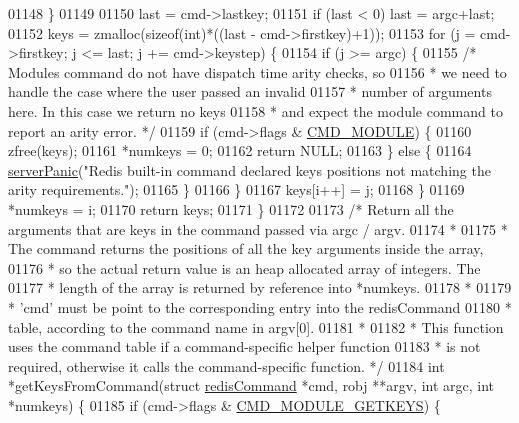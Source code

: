 \begin{DoxyCode}
01148     \}
01149 
01150     last = cmd->lastkey;
01151     \textcolor{keywordflow}{if} (last < 0) last = argc+last;
01152     keys = zmalloc(\textcolor{keyword}{sizeof}(\textcolor{keywordtype}{int})*((last - cmd->firstkey)+1));
01153     \textcolor{keywordflow}{for} (j = cmd->firstkey; j <= last; j += cmd->keystep) \{
01154         \textcolor{keywordflow}{if} (j >= argc) \{
01155             \textcolor{comment}{/* Modules command do not have dispatch time arity checks, so}
01156 \textcolor{comment}{             * we need to handle the case where the user passed an invalid}
01157 \textcolor{comment}{             * number of arguments here. In this case we return no keys}
01158 \textcolor{comment}{             * and expect the module command to report an arity error. */}
01159             \textcolor{keywordflow}{if} (cmd->flags & \hyperlink{server_8h_accabd32f20281543986166c219124f9e}{CMD\_MODULE}) \{
01160                 zfree(keys);
01161                 *numkeys = 0;
01162                 \textcolor{keywordflow}{return} NULL;
01163             \} \textcolor{keywordflow}{else} \{
01164                 \hyperlink{server_8h_a11cc378e7778a830b41240578de3b204}{serverPanic}(\textcolor{stringliteral}{"Redis built-in command declared keys positions not matching
       the arity requirements."});
01165             \}
01166         \}
01167         keys[i++] = j;
01168     \}
01169     *numkeys = i;
01170     \textcolor{keywordflow}{return} keys;
01171 \}
01172 
01173 \textcolor{comment}{/* Return all the arguments that are keys in the command passed via argc / argv.}
01174 \textcolor{comment}{ *}
01175 \textcolor{comment}{ * The command returns the positions of all the key arguments inside the array,}
01176 \textcolor{comment}{ * so the actual return value is an heap allocated array of integers. The}
01177 \textcolor{comment}{ * length of the array is returned by reference into *numkeys.}
01178 \textcolor{comment}{ *}
01179 \textcolor{comment}{ * 'cmd' must be point to the corresponding entry into the redisCommand}
01180 \textcolor{comment}{ * table, according to the command name in argv[0].}
01181 \textcolor{comment}{ *}
01182 \textcolor{comment}{ * This function uses the command table if a command-specific helper function}
01183 \textcolor{comment}{ * is not required, otherwise it calls the command-specific function. */}
01184 \textcolor{keywordtype}{int} *getKeysFromCommand(\textcolor{keyword}{struct} \hyperlink{structredisCommand}{redisCommand} *cmd, robj **argv, \textcolor{keywordtype}{int} argc, \textcolor{keywordtype}{int} *numkeys) \{
01185     \textcolor{keywordflow}{if} (cmd->flags & \hyperlink{server_8h_a612a8681d1a25cd86faf4139d161316a}{CMD\_MODULE\_GETKEYS}) \{

\end{DoxyCode}
